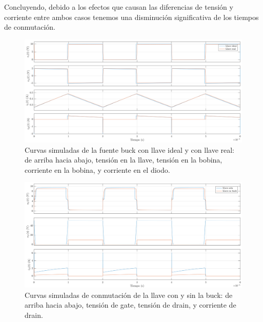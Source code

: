 \documentclass[e4_tp1_main.tex]{subfiles}
\begin{document}
Concluyendo, debido a los efectos que causan las diferencias de tensión y corriente entre ambos casos tenemos una disminución significativa de los tiempos de conmutación.

\begin{landscape}
	\vspace*{\fill}
	\begin{figure}[ht]
		\centering
		\includegraphics[scale=0.7]{images/ej3/curvas3.png}
		\caption{Curvas simuladas de la fuente buck con llave ideal y con llave real: de arriba hacia abajo, tensi\'on en la llave, tensi\'on en la bobina, corriente en la bobina, y corriente en el diodo.}
		\label{fig:curvas3}
	\end{figure}
	\vspace*{\fill}
\end{landscape}

\begin{landscape}
	\vspace*{\fill}
	\begin{figure}[ht]
		\centering
		\includegraphics[scale=0.67]{images/ej3/conmutacion3.png}
		\caption{Curvas simuladas de conmutaci\'on de la llave con y sin la buck: de arriba hacia abajo, tensi\'on de gate, tensi\'on de drain, y corriente de drain.}
		\label{fig:curvas3}
	\end{figure}
	\vspace*{\fill}
\end{landscape}
\end{document}
